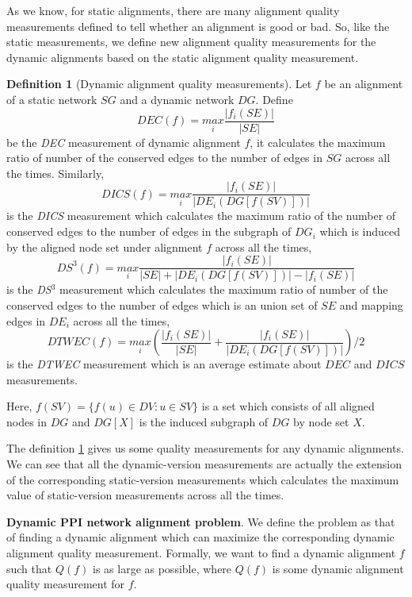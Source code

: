\documentclass{bioinfo}
\theoremstyle{definition}
\newtheorem{defn}{\textbf{Definition}}[section]%
\begin{document}
\begin{methods}
As we know, for static alignments, there are many alignment quality measurements defined to tell whether an alignment is good or bad. So, like the static measurements, we define new alignment quality measurements for the dynamic alignments based on the static alignment quality measurement.
\begin{defn}[Dynamic alignment quality measurements]
\label{defndmeasure}
Let $f$ be an alignment of a static network $SG$ and a dynamic network $DG$. Define $$DEC(f)=\underset{i}{max}\frac{\left | f_i(SE) \right |}{\left | SE \right |}$$ be the \textit{DEC} measurement of dynamic alignment $f$, it calculates the maximum ratio of number of the conserved edges to the number of edges in $SG$ across all the times.
Similarly, 
$$DICS(f)=\underset{i}{max}\frac{\left | f_i(SE) \right |}{\left |DE_i(DG[f(SV)])\right |}$$ is the \textit{DICS} measurement which calculates the maximum ratio of the number of conserved edges to the number of edges in the subgraph of $DG_i$ which is induced by the aligned node set under alignment $f$ across all the times,
$$DS^{3}(f)=\underset{i}{max}\frac{\left | f_i(SE) \right |}{\left | SE \right |+\left |DE_i(DG[f(SV)]) \right |-\left | f_i(SE) \right |}$$ is the \textit{DS}$^{3}$ measurement which calculates the maximum ratio of number of the conserved edges to the number of edges which is an union set of $SE$ and mapping edges in $DE_i$ across all the times,
$$DTWEC(f)=\underset{i}{max}(\frac{\left | f_i(SE) \right |}{\left | SE \right |}+\frac{\left | f_i(SE) \right |}{\left |DE_i(DG[f(SV)])\right |})/2$$ is the \textit{DTWEC} measurement which is an average estimate about $DEC$ and $DICS$ measurements. 

Here, $f(SV)=\{f(u)\in DV:u\in SV\}$ is a set which consists of all aligned nodes in $DG$ and $DG[X]$ is the induced subgraph of $DG$ by node set $X$.
\end{defn}

The definition \ref{defndmeasure} gives us some quality measurements for any dynamic alignments. We can see that all the dynamic-version measurements are actually the extension of the corresponding static-version measurements which calculates the maximum value of static-version measurements across all the times.

\textbf{Dynamic PPI network alignment problem}. We define the problem as that of finding a dynamic alignment which can maximize the corresponding dynamic alignment quality measurement. Formally, we want to find a dynamic alignment $f$ such that $Q(f)$ is as large as possible, where $Q(f)$ is some dynamic alignment quality measurement for $f$.


\end{methods}
\end{document}
